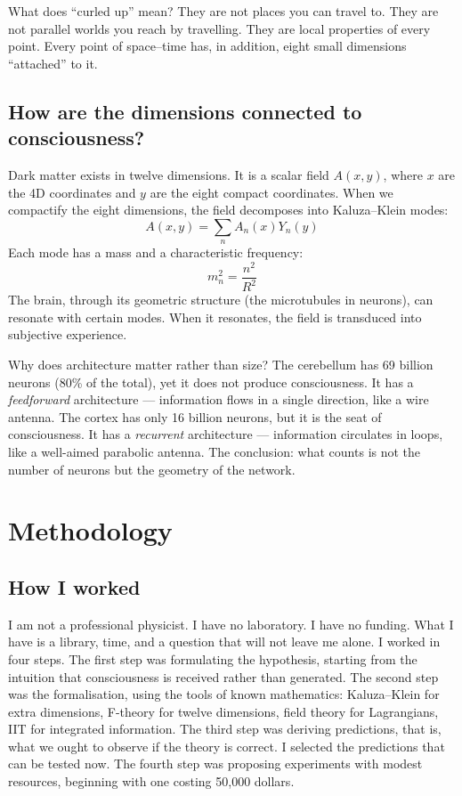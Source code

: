 What does ``curled up'' mean? They are not places you can travel to. They are not parallel worlds you reach by travelling. They are local properties of every point. Every point of space--time has, in addition, eight small dimensions ``attached'' to it.

\subsection{How are the dimensions connected to consciousness?}
Dark matter exists in twelve dimensions. It is a scalar field $A(x,y)$, where $x$ are the 4D coordinates and $y$ are the eight compact coordinates. When we compactify the eight dimensions, the field decomposes into Kaluza--Klein modes:
\begin{equation}
A(x,y) = \sum_n A_n(x) Y_n(y)
\end{equation}
Each mode has a mass and a characteristic frequency:
\begin{equation}
m_n^2 = \frac{n^2}{R^2}
\end{equation}
The brain, through its geometric structure (the microtubules in neurons), can resonate with certain modes. When it resonates, the field is transduced into subjective experience.

Why does architecture matter rather than size? The cerebellum has 69 billion neurons (80\% of the total), yet it does not produce consciousness. It has a \textit{feedforward} architecture --- information flows in a single direction, like a wire antenna. The cortex has only 16 billion neurons, but it is the seat of consciousness. It has a \textit{recurrent} architecture --- information circulates in loops, like a well-aimed parabolic antenna. The conclusion: what counts is not the number of neurons but the geometry of the network.

\section{Methodology}
\subsection{How I worked}
I am not a professional physicist. I have no laboratory. I have no funding. What I have is a library, time, and a question that will not leave me alone. I worked in four steps. The first step was formulating the hypothesis, starting from the intuition that consciousness is received rather than generated. The second step was the formalisation, using the tools of known mathematics: Kaluza--Klein for extra dimensions, F-theory for twelve dimensions, field theory for Lagrangians, IIT for integrated information. The third step was deriving predictions, that is, what we ought to observe if the theory is correct. I selected the predictions that can be tested now. The fourth step was proposing experiments with modest resources, beginning with one costing 50,000 dollars.

